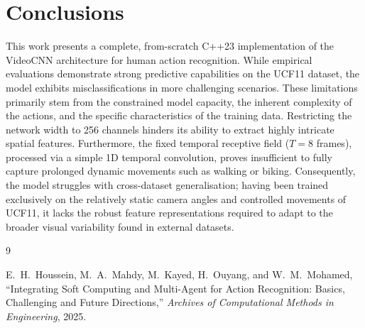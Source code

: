 \documentclass[11pt,a4paper]{article}
\begin{document}
\section{Conclusions}
\label{sec:conc}

This work presents a complete, from-scratch C++23 implementation of the VideoCNN architecture for human action recognition. While empirical evaluations demonstrate strong predictive capabilities on the UCF11 dataset, the model exhibits misclassifications in more challenging scenarios. These limitations primarily stem from the constrained model capacity, the inherent complexity of the actions, and the specific characteristics of the training data. Restricting the network width to 256 channels hinders its ability to extract highly intricate spatial features. Furthermore, the fixed temporal receptive field ($T=8$ frames), processed via a simple 1D temporal convolution, proves insufficient to fully capture prolonged dynamic movements such as walking or biking. Consequently, the model struggles with cross-dataset generalisation; having been trained exclusively on the relatively static camera angles and controlled movements of UCF11, it lacks the robust feature representations required to adapt to the broader visual variability found in external datasets.
\begin{thebibliography}{9}

E.~H.~Houssein, M.~A.~Mahdy, M.~Kayed, H.~Ouyang, and W.~M.~Mohamed,
``Integrating Soft Computing and Multi-Agent for Action Recognition: Basics, Challenging and Future Directions,''
\emph{Archives of Computational Methods in Engineering}, 2025.

\end{thebibliography}
\end{document}
